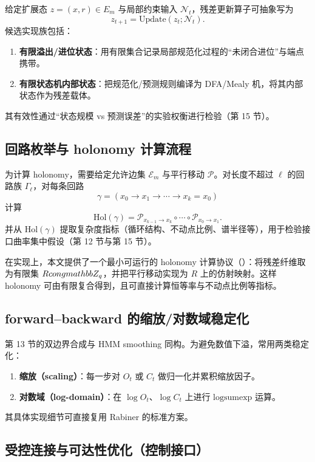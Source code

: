 给定扩展态 $z=(x,r)\in E_m$ 与局部约束输入 $\mathcal N_t$，残差更新算子可抽象写为
$$
z_{t+1}=\mathrm{Update}(z_t;\mathcal N_t).
$$
候选实现族包括：
\begin{enumerate}
  \item \textbf{有限溢出/进位状态}：用有限集合记录局部规范化过程的“未闭合进位”与端点携带。
  \item \textbf{有限状态机内部状态}：把规范化/预测规则编译为 DFA/Mealy 机，将其内部状态作为残差载体。
\end{enumerate}
其有效性通过“状态规模 vs 预测误差”的实验权衡进行检验（第 15 节）。

\subsection{回路枚举与 holonomy 计算流程}

为计算 holonomy，需要给定允许边集 $\mathcal E_m$ 与平行移动 $\mathcal P$。对长度不超过 $\ell$ 的回路族 $\Gamma_\ell$，对每条回路
$$
\gamma=(x_0\to x_1\to\cdots\to x_k=x_0)
$$
计算
$$
\mathrm{Hol}(\gamma)=\mathcal P_{x_{k-1}\to x_k}\circ\cdots\circ\mathcal P_{x_0\to x_1}.
$$
并从 $\mathrm{Hol}(\gamma)$ 提取复杂度指标（循环结构、不动点比例、谱半径等），用于检验接口曲率集中假设（第 12 节与第 15 节）。

在实现上，本文提供了一个最小可运行的 holonomy 计算协议（）：将残差纤维取为有限集 $R\\cong\\mathbb Z_q$，并把平行移动实现为 $R$ 上的仿射映射。这样 holonomy 可由有限复合得到，且可直接计算恒等率与不动点比例等指标。

\subsection{forward--backward 的缩放/对数域稳定化}

第 13 节的双边界合成与 HMM smoothing 同构。为避免数值下溢，常用两类稳定化：
\begin{enumerate}
  \item \textbf{缩放（scaling）}：每一步对 $O_t$ 或 $C_t$ 做归一化并累积缩放因子。
  \item \textbf{对数域（log-domain）}：在 $\log O_t$、$\log C_t$ 上进行 $\mathrm{logsumexp}$ 运算。
\end{enumerate}
其具体实现细节可直接复用 Rabiner 的标准方案。\cite{rabiner_hmm_tutorial}

\subsection{受控连接与可达性优化（控制接口）}

